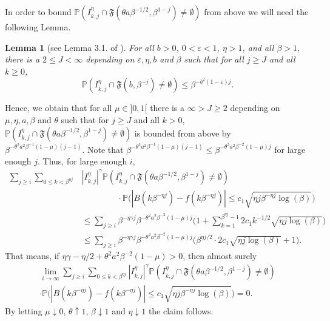 \documentclass[11pt, reqno]{amsart}
\theoremstyle{plain}
\newtheorem{lemma}[theorem]{Lemma}
\theoremstyle{definition}
\theoremstyle{remark}
\begin{document}
In order to bound ${\mathbb{P}}(I_{k,j}^\eta \cap {\mathfrak{F}}(\theta a\beta^{-1/2},\beta^{1-j}) \neq \emptyset)$ from above we will need the following
Lemma.
\begin{lemma}[see Lemma 3.1. of \cite{KS}]
 For all $b>0$, $0 < \varepsilon < 1$, $\eta >1$, and all $\beta > 1$, there is a $ 2 \leq J < \infty$ depending on $\varepsilon, \eta, b$ and $\beta$ such that for all
 $j \geq J$ and all $k\geq 0$,
$${\mathbb{P}}(I_{k,j}^\eta \cap {\mathfrak{F}}(b,\beta^{-j}) \neq \emptyset) \leq \beta^{-b^2(1-\varepsilon)j}.$$
 \end{lemma}
Hence, we obtain that for all $\mu\in]0,1[$ there is a $\infty>J\geq 2$ depending on $\mu,\eta, a, \beta$ and $\theta$ such that for $j\geq J$ and all $k>0$, ${\mathbb{P}}(I_{k,j}^\eta \cap {\mathfrak{F}}(\theta a\beta^{-1/2},\beta^{1-j}) \neq \emptyset)$ is bounded from above by $\beta^{-\theta^2 a^2 \beta^{-1}(1-\mu)(j-1)}$. Note that $\beta^{-\theta^2 a^2 \beta^{-1}(1-\mu)(j-1)} \leq \beta^{-\theta^2 a^2 \beta^{-2}(1-\mu)j}$ for large enough $j$.
Thus, for large enough $i$,
\begin{align*}
\sum_{j\geq i}  \sum_{0 \leq k < \beta^{\eta j }} &|I_{k,j}^\eta|^{\gamma} {\mathbb{P}}(I_{k,j}^\eta \cap {\mathfrak{F}}(\theta a\beta^{-1/2},\beta^{1-j}) \neq \emptyset)  \\
& \ \ \ \ \ \ \ \ \ \ \ \ \ \ \ \ \ \ \ \cdot {\mathbb{P}}\big(|B(k \beta^{-\eta j})  - f(k\beta^{-\eta j})| \leq c_1 \sqrt{\eta j \beta^{-\eta j} \log(\beta)} \big) \\
&\leq \sum_{j\geq i} \beta^{-\eta \gamma j} \beta^{-\theta^2 a^2 \beta^{-2} (1-\mu)j} \Big(1+ \sum_{k=1}^{\beta^{\eta j }-1} 2c_1k^{-1/2}\sqrt{\eta j \log(\beta)} \Big)\\
&\leq \sum_{j\geq i}\beta^{-\eta \gamma j} \beta^{-\theta^2 a^2 \beta^{-2} (1-\mu)j} \big(\beta^{\eta j/2 }\cdot 2c_1\sqrt{\eta j \log(\beta)} +1\big).
\end{align*}
That means, if $\eta \gamma - \eta/2 + \theta^2 a^2 \beta^{-2}(1-\mu) > 0$, then almost surely
\begin{multline*}
\lim_{i \rightarrow \infty}\sum_{j\geq i} \sum_{0 \leq k < \beta^{\eta j }} |I_{k,j}^\eta|^{\gamma} {\mathbb{P}}(I_{k,j}^\eta \cap {\mathfrak{F}}(\theta a\beta^{-1/2},\beta^{1-j}) \neq \emptyset)  \\
\cdot {\mathbb{P}}\big(|B(k \beta^{-\eta j})  - f(k\beta^{-\eta j})| \leq c_1 \sqrt{\eta j \beta^{-\eta j} \log(\beta)} \big) = 0.
\end{multline*}
By letting $\mu \downarrow 0$, $\theta \uparrow 1$, $\beta \downarrow 1$ and $\eta \downarrow 1$ the claim follows.
\end{document}
